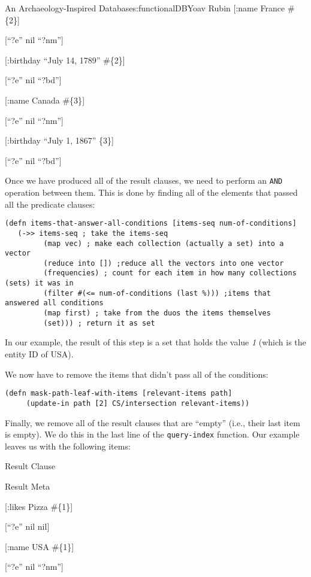 \begin{aosachapter}{An Archaeology-Inspired Database}{s:functionalDB}{Yoav Rubin}
{[}:name France \#\{2\}{]}

{[}``?e'' nil ``?nm''{]}

{[}:birthday ``July 14, 1789'' \#\{2\}{]}

{[}``?e'' nil ``?bd''{]}

{[}:name Canada \#\{3\}{]}

{[}``?e'' nil ``?nm''{]}

{[}:birthday ``July 1, 1867'' \{3\}{]}

{[}``?e'' nil ``?bd''{]}

Once we have produced all of the result clauses, we need to perform an
\texttt{AND} operation between them. This is done by finding all of the
elements that passed all the predicate clauses:

\begin{verbatim}
(defn items-that-answer-all-conditions [items-seq num-of-conditions]
   (->> items-seq ; take the items-seq
         (map vec) ; make each collection (actually a set) into a vector
         (reduce into []) ;reduce all the vectors into one vector
         (frequencies) ; count for each item in how many collections (sets) it was in
         (filter #(<= num-of-conditions (last %))) ;items that answered all conditions
         (map first) ; take from the duos the items themselves
         (set))) ; return it as set
\end{verbatim}

In our example, the result of this step is a set that holds the value
\emph{1} (which is the entity ID of USA).

We now have to remove the items that didn't pass all of the conditions:

\begin{verbatim}
(defn mask-path-leaf-with-items [relevant-items path]
     (update-in path [2] CS/intersection relevant-items))
\end{verbatim}

Finally, we remove all of the result clauses that are ``empty'' (i.e.,
their last item is empty). We do this in the last line of the
\texttt{query-index} function. Our example leaves us with the following
items:

Result Clause

Result Meta

{[}:likes Pizza \#\{1\}{]}

{[}``?e'' nil nil{]}

{[}:name USA \#\{1\}{]}

{[}``?e'' nil ``?nm''{]}


\end{aosachapter}
